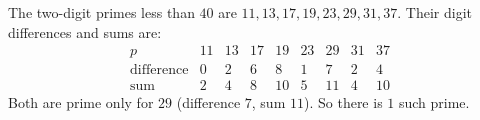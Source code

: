 The two-digit primes less than $40$ are $11,13,17,19,23,29,31,37$. Their digit differences and sums are:
\[
\begin{array}{c|cccccccc}
p & 11 & 13 & 17 & 19 & 23 & 29 & 31 & 37\\ \hline
\text{difference} & 0 & 2 & 6 & 8 & 1 & 7 & 2 & 4\\
\text{sum} & 2 & 4 & 8 & 10 & 5 & 11 & 4 & 10
\end{array}
\]
Both are prime only for $29$ (difference $7$, sum $11$). So there is $\boxed{1}$ such prime.
